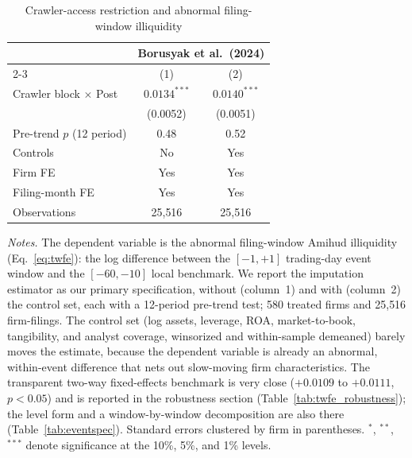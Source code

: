 \begin{table}[t]
\centering
\begin{threeparttable}
\caption{Crawler-access restriction and abnormal filing-window illiquidity}
\label{tab:main}
\small
\begin{tabular}{lcc}
\toprule
 & \multicolumn{2}{c}{Borusyak et al.\ (2024)} \\
\cmidrule(lr){2-3}
 & (1) & (2) \\
\midrule
Crawler block $\times$ Post & $0.0134^{***}$ & $0.0140^{***}$ \\
                            & (0.0052)       & (0.0051) \\
Pre-trend $p$ (12 period)   & 0.48           & 0.52 \\
\midrule
Controls         & No   & Yes \\
Firm FE          & Yes  & Yes \\
Filing-month FE  & Yes  & Yes \\
Observations     & 25{,}516 & 25{,}516 \\
\bottomrule
\end{tabular}
\begin{tablenotes}\footnotesize
\item \textit{Notes.} The dependent variable is the abnormal filing-window Amihud illiquidity (Eq.~\ref{eq:twfe}): the log difference between the $[-1,+1]$ trading-day event window and the $[-60,-10]$ local benchmark. We report the \citet{BorusyakJaravelSpiess2024} imputation estimator as our primary specification, without (column~1) and with (column~2) the control set, each with a 12-period pre-trend test; 580 treated firms and 25{,}516 firm-filings. The control set (log assets, leverage, ROA, market-to-book, tangibility, and analyst coverage, winsorized and within-sample demeaned) barely moves the estimate, because the dependent variable is already an abnormal, within-event difference that nets out slow-moving firm characteristics. The transparent two-way fixed-effects benchmark is very close ($+0.0109$ to $+0.0111$, $p<0.05$) and is reported in the robustness section (Table~\ref{tab:twfe_robustness}); the level form and a window-by-window decomposition are also there (Table~\ref{tab:eventspec}). Standard errors clustered by firm in parentheses. $^{*}$, $^{**}$, $^{***}$ denote significance at the 10\%, 5\%, and 1\% levels.
\end{tablenotes}
\end{threeparttable}
\end{table}
